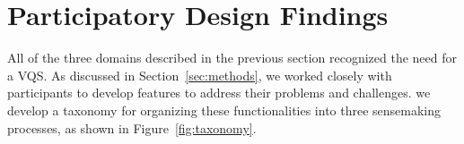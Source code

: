 \section{Participatory Design Findings\label{sec:pd_findings}}
All of the three domains described in the previous section recognized the need for a VQS. As discussed in Section~\ref{sec:methods}, we worked closely with participants to develop features to address their problems and challenges.  we develop a taxonomy for organizing these functionalities into three sensemaking processes, as shown in Figure~\ref{fig:taxonomy}. %
